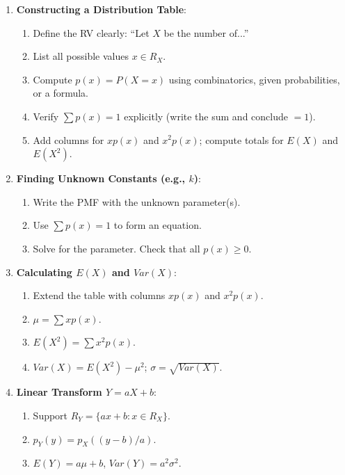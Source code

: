 \documentclass[11pt]{article}
\begin{document}
\begin{methode}
\begin{enumerate}
    \item \textbf{Constructing a Distribution Table}:
          \begin{enumerate}
              \item Define the RV clearly: ``Let $X$ be the number of...''
              \item List all possible values $x \in R_X$.
              \item Compute $p(x) = P(X=x)$ using combinatorics, given probabilities, or a formula.
              \item Verify $\sum p(x) = 1$ explicitly (write the sum and conclude $=1$).
              \item Add columns for $xp(x)$ and $x^2p(x)$; compute totals for $E(X)$ and $E(X^2)$.
          \end{enumerate}
    \item \textbf{Finding Unknown Constants (e.g., $k$)}:
          \begin{enumerate}
              \item Write the PMF with the unknown parameter(s).
              \item Use $\sum p(x) = 1$ to form an equation.
              \item Solve for the parameter. Check that all $p(x) \ge 0$.
          \end{enumerate}
    \item \textbf{Calculating $E(X)$ and $Var(X)$}:
          \begin{enumerate}
              \item Extend the table with columns $xp(x)$ and $x^2p(x)$.
              \item $\mu = \sum xp(x)$.
              \item $E(X^2) = \sum x^2p(x)$.
              \item $Var(X) = E(X^2) - \mu^2$; $\sigma = \sqrt{Var(X)}$.
          \end{enumerate}
    \item \textbf{Linear Transform $Y = aX+b$}:
          \begin{enumerate}
              \item Support $R_Y = \{ax+b : x \in R_X\}$.
              \item $p_Y(y) = p_X((y-b)/a)$.
              \item $E(Y) = a\mu + b$, $Var(Y) = a^2\sigma^2$.

\end{enumerate}
\end{enumerate}
\end{methode}
\end{document}
